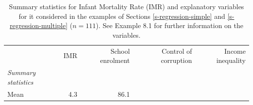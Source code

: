 \documentclass[11pt,a4paper,openany]{book}
\begin{document}
\begin{longtable}[]{@{}lrrrr@{}}
\caption{\label{tab:t-imrvars} Summary statistics for Infant Mortality Rate
(IMR) and explanatory variables for it considered in the examples of
Sections \ref{s-regression-simple} and \ref{s-regression-multiple}
(\(n=111\)). See Example 8.1 for further information on the
variables.}\tabularnewline
\toprule
\begin{minipage}[t]{0.41\columnwidth}\raggedright\strut
\strut
\end{minipage} & \begin{minipage}[t]{0.20\columnwidth}\raggedleft\strut
IMR\strut
\end{minipage} & \begin{minipage}[t]{0.07\columnwidth}\raggedleft\strut
School enrolment\strut
\end{minipage} & \begin{minipage}[t]{0.08\columnwidth}\raggedleft\strut
Control of corruption\strut
\end{minipage} & \begin{minipage}[t]{0.08\columnwidth}\raggedleft\strut
Income inequality\strut
\end{minipage}\tabularnewline
\begin{minipage}[t]{0.41\columnwidth}\raggedright\strut
\emph{Summary statistics}\strut
\end{minipage} & \begin{minipage}[t]{0.20\columnwidth}\raggedleft\strut
\strut
\end{minipage} & \begin{minipage}[t]{0.07\columnwidth}\raggedleft\strut
\strut
\end{minipage} & \begin{minipage}[t]{0.08\columnwidth}\raggedleft\strut
\strut
\end{minipage} & \begin{minipage}[t]{0.08\columnwidth}\raggedleft\strut
\strut
\end{minipage}\tabularnewline
\begin{minipage}[t]{0.41\columnwidth}\raggedright\strut
Mean\strut
\end{minipage} & \begin{minipage}[t]{0.20\columnwidth}\raggedleft\strut
4.3\strut
\end{minipage} & \begin{minipage}[t]{0.07\columnwidth}\raggedleft\strut
86.1\strut
\end{minipage} & \begin{minipage}[t]{0.08\columnwidth}\raggedleft\strut

\end{minipage}
\end{longtable}
\end{document}
